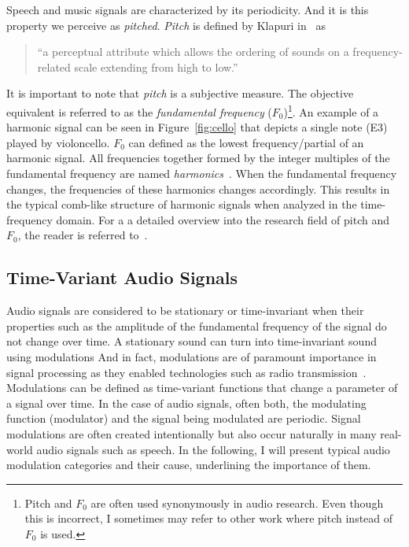 Speech and music signals are characterized by its periodicity.
And it is this property we perceive as \emph{pitched}.
\emph{Pitch} is defined by Klapuri in~\cite{klapuri06book} as 

\begin{quote}
``a perceptual attribute which allows the ordering of sounds on a frequency-related scale extending from high to low.''
\end{quote}

It is important to note that \emph{pitch} is a subjective measure.
The objective equivalent is referred to as the \emph{fundamental frequency} (\(F_0\))\footnote{Pitch and $F_{0}$ are often used synonymously in audio research. 
Even though this is incorrect, I sometimes may refer to other work where pitch instead of $F_{0}$ is used.}.
An example of a harmonic signal can be seen in Figure~\ref{fig:cello} that depicts a single note (E3) played by violoncello.
\(F_{0}\) can defined as the lowest frequency/partial of an harmonic signal.
All frequencies together formed by the integer multiples of the fundamental frequency are named \textit{harmonics}~\cite{schenker54}.
When the fundamental frequency changes, the frequencies of these harmonics changes accordingly.
This results in the typical comb-like structure of harmonic signals when analyzed in the time-frequency domain.
For a a detailed overview into the research field of pitch and \(F_{0}\), the reader is referred to~\cite{klapuri06book}.

\subsection{Time-Variant Audio Signals}\label{sub:time-variant-audio-signals}

Audio signals are considered to be stationary or time-invariant when their properties such as the amplitude of the fundamental frequency of the signal do not change over time.
A stationary sound can turn into time-invariant sound using modulations
And in fact, modulations are of paramount importance in signal processing as they enabled technologies such as radio transmission~\cite{shannon48}.
Modulations can be defined as time-variant functions that change a parameter of a signal over time.
In the case of audio signals, often both, the modulating function (modulator) and the signal being modulated are periodic.
Signal modulations are often created intentionally but also occur naturally in many real-world audio signals such as speech.
In the following, I will present typical audio modulation categories and their cause, underlining the importance of them.

